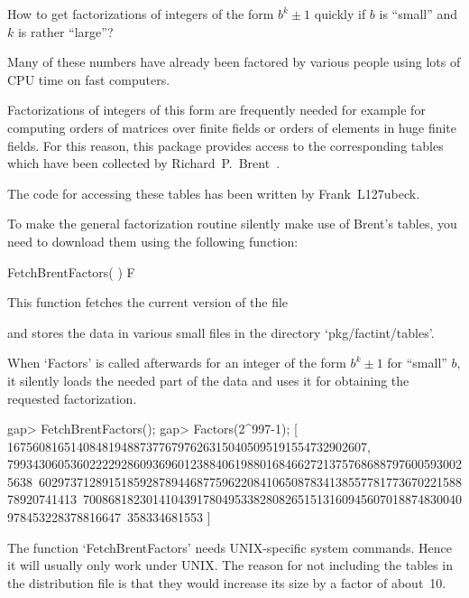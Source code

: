 

How to get factorizations of integers of the form $b^k \pm 1$ quickly
if $b$ is ``small'' and $k$ is rather ``large''?

Many of these numbers have already been factored by various people
using lots of CPU time on fast computers.

Factorizations of integers of this form are frequently needed for
example for computing orders of matrices over finite fields or orders of
elements in huge finite fields. For this reason, this package provides
access to the corresponding tables which have been collected by
Richard~P.~Brent~\cite{Brent04}.

The code for accessing these tables has been written by Frank~L\accent127ubeck.

To make the general factorization routine silently make use of Brent's
tables, you need to download them using the following function:

\>FetchBrentFactors( ) F

This function fetches the current version of the file


and stores the data in various small files in the directory `pkg/factint/tables'.

When `Factors' is called afterwards for an integer of the form
$b^k \pm 1$ for ``small'' $b$, it silently loads the needed part of
the data and uses it for obtaining the requested factorization.

\beginexample
gap> FetchBrentFactors();
gap> Factors(2^997-1);
[ 167560816514084819488737767976263150405095191554732902607,
  7993430605360222292860936960123884061988016846627213757686887976005930025638\
602973712891518592878944687759622084106508783413855778177367022158878920741413\
700868182301410439178049533828082651513160945607018874830040978453228378816647\
358334681553 ]
\endexample

The function `FetchBrentFactors' needs UNIX-specific system commands.
Hence it will usually only work under UNIX. The reason for not including
the tables in the distribution file is that they would increase its size
by a factor of about~10.

